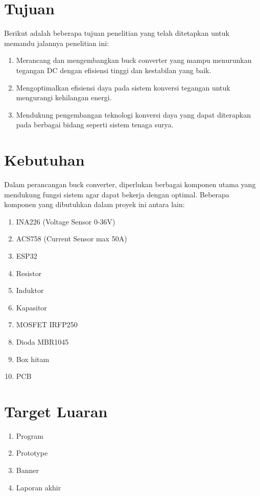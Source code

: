 \section{Tujuan }
Berikut adalah beberapa tujuan penelitian yang telah ditetapkan untuk memandu jalannya penelitian ini: 
\begin{enumerate}
    \item Merancang dan mengembangkan buck converter yang mampu menurunkan tegangan DC dengan efisiensi tinggi dan kestabilan yang baik.
    \item Mengoptimalkan efisiensi daya pada sistem konversi tegangan untuk mengurangi kehilangan energi.
    \item Mendukung pengembangan teknologi konversi daya yang dapat diterapkan pada berbagai bidang seperti sistem tenaga surya.
\end{enumerate}

\section{Kebutuhan}
Dalam perancangan buck converter, diperlukan berbagai komponen utama yang mendukung fungsi sistem agar dapat bekerja dengan optimal. Beberapa komponen yang dibutuhkan dalam proyek ini antara lain:
\begin{enumerate}
    \item INA226 (Voltage Sensor 0-36V)
    \item ACS758 (Current Sensor max 50A)
    \item ESP32
    \item Resistor
    \item Induktor
    \item Kapasitor
    \item MOSFET IRFP250
    \item Dioda MBR1045
    \item Box hitam
    \item PCB
\end{enumerate}

\section{Target Luaran}
\begin{enumerate}
	\item Program
	\item Prototype
	\item Banner
	\item Laporan akhir
\end{enumerate}

